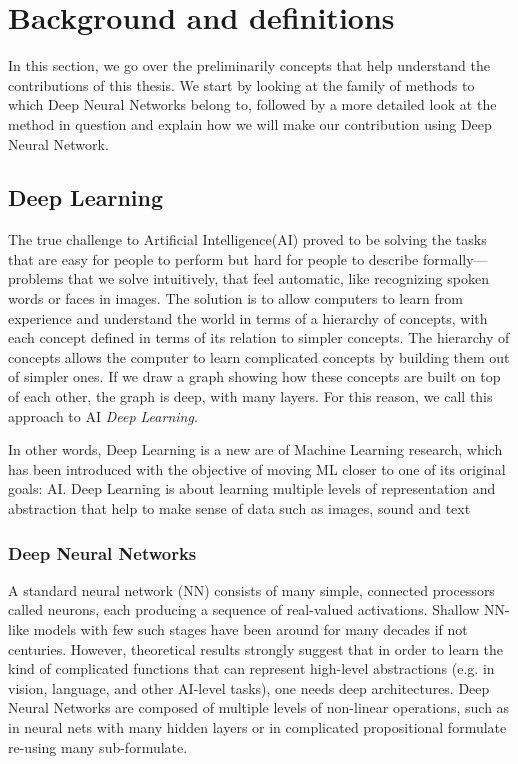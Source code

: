 \chapter{Background and definitions}
\label{sec:Background}
In this section, we go over the preliminarily concepts that help understand the contributions of this thesis. We start by looking at the family of methods to which Deep Neural Networks belong to, followed by a more detailed look at the method in question and explain how we will make our contribution using Deep Neural Network. 

\section{Deep Learning}

The true challenge to Artificial Intelligence(AI) proved to be solving the tasks that are easy for people to perform but hard for people to describe formally—problems that we solve intuitively, that feel automatic, like recognizing spoken words or faces in images. The solution is to allow computers to learn from experience and understand the world in terms of a hierarchy of concepts, with each concept defined in terms of its relation to simpler concepts. The hierarchy of concepts allows the computer to learn complicated concepts by building them out of simpler ones. If we draw a graph showing how these concepts are built on top of each other, the graph is deep, with many layers. For this reason, we call this approach to AI \textit{Deep Learning}\cite{dl book}.

In other words,  Deep Learning is a new are of Machine Learning research, which has been introduced with the objective of moving ML closer to one of its original goals: AI. Deep Learning is about learning multiple levels of representation and abstraction that help to make sense of data such as images, sound and text\cite{dldef2} 

\subsection{Deep Neural Networks}

A standard neural network (NN) consists of many simple, connected processors called neurons, each producing a sequence of real-valued activations. Shallow NN-like models with few such stages have been around for many decades if not centuries\cite{deepnn}. However, theoretical results strongly suggest that in order to learn the kind of complicated functions that can represent high-level abstractions (e.g. in vision, language, and other AI-level tasks), one needs deep architectures. Deep Neural Networks are composed of multiple levels of non-linear operations, such as in neural nets with many hidden layers or in complicated propositional formulate re-using many sub-formulate\cite{dl for ai}.






